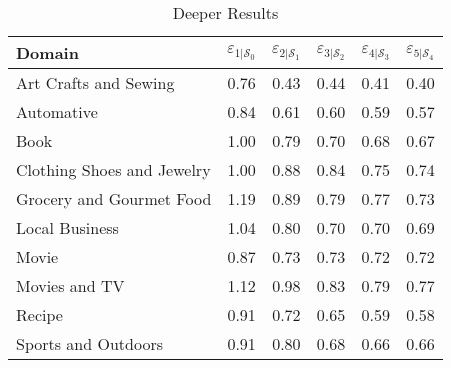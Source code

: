 \begin{table}[h]
    \centering
    \scriptsize
    \def\arraystretch{.99}
    \setlength{\tabcolsep}{0.42em}
    \begin{tabular}{lccccc}
      \toprule
      \textbf{Domain} & $\varepsilon_{1|\mathcal{S}_0}$ & $\varepsilon_{2|\mathcal{S}_1}$ & $\varepsilon_{3|\mathcal{S}_2}$ & $\varepsilon_{4|\mathcal{S}_3}$ & $\varepsilon_{5|\mathcal{S}_4}$ \\
      \midrule
      Art Crafts and Sewing     & 0.76 & 0.43 & 0.44 & 0.41 & 0.40 \\
      Automative                & 0.84 & 0.61 & 0.60 & 0.59 & 0.57 \\
      Book                      & 1.00 & 0.79 & 0.70 & 0.68 & 0.67 \\
      Clothing Shoes and Jewelry& 1.00 & 0.88 & 0.84 & 0.75 & 0.74 \\
      Grocery and Gourmet Food  & 1.19 & 0.89 & 0.79 & 0.77 & 0.73 \\
      Local Business            & 1.04 & 0.80 & 0.70 & 0.70 & 0.69 \\
      Movie                     & 0.87 & 0.73 & 0.73 & 0.72 & 0.72 \\
      Movies and TV             & 1.12 & 0.98 & 0.83 & 0.79 & 0.77 \\
      Recipe                    & 0.91 & 0.72 & 0.65 & 0.59 & 0.58 \\
      Sports and Outdoors       & 0.91 & 0.80 & 0.68 & 0.66 & 0.66 \\
      \bottomrule
    \end{tabular}
    \caption{Deeper Results}
    \label{tab:Deeper_results}
    \vspace{-0.1cm}
  \end{table}
  




